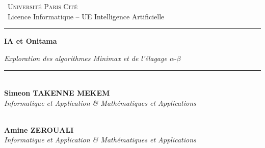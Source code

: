 \documentclass[12pt, a4paper]{article}
\begin{document}
\begin{titlepage}
\centering

\vspace*{1cm}

{\large\textsc{\textcolor{main}{\faUniversity\ Université Paris Cité}}} \\
\vspace{0.2cm}
{\normalsize \faGraduationCap\ Licence Informatique -- UE Intelligence Artificielle}

\vspace{1cm}

\rule{0.7\linewidth}{1.2pt}

\vspace{1.5cm}

{\Huge\bfseries\color{main} IA et Onitama}

\vspace{0.5cm}

{\Large\itshape Exploration des algorithmes Minimax et de l'élagage $\alpha\text{-}\beta$}

\vspace{1.5cm}

\rule{0.7\linewidth}{1.2pt}

\vspace{2cm}
\begin{minipage}{0.9\textwidth}
    \centering
    \large
    \begin{minipage}[t]{0.45\textwidth}
        \centering
        \textcolor{main}{\faUser} \\
        \textbf{Simeon TAKENNE MEKEM} \\
        \textit{\small Informatique et Application \& Mathématiques et Applications}
    \end{minipage}
    \hfill %
    \begin{minipage}[t]{0.45\textwidth}
        \centering
        \textcolor{main}{\faUser} \\
        \textbf{Amine ZEROUALI} \\
        \textit{\small Informatique et Application \& Mathématiques et Applications}
    \end{minipage}
\end{minipage}
\vspace{2cm}


\end{titlepage}
\end{document}
